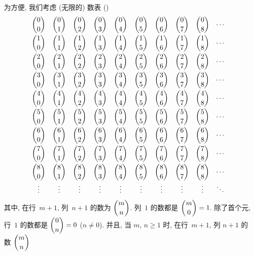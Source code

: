 \documentclass[../libro.tex]{subfiles}
\begin{document}
为方便, 我们考虑 (无限的) 数表 ()
\begin{equation}
    \begin{matrix}
        \dbinom{0}{0} & \dbinom{0}{1} & \dbinom{0}{2} & \dbinom{0}{3} & \dbinom{0}{4} & \dbinom{0}{5} & \dbinom{0}{6} & \dbinom{0}{7} & \dbinom{0}{8} & \cdots \\[2ex]
        \dbinom{1}{0} & \dbinom{1}{1} & \dbinom{1}{2} & \dbinom{1}{3} & \dbinom{1}{4} & \dbinom{1}{5} & \dbinom{1}{6} & \dbinom{1}{7} & \dbinom{1}{8} & \cdots \\[2ex]
        \dbinom{2}{0} & \dbinom{2}{1} & \dbinom{2}{2} & \dbinom{2}{3} & \dbinom{2}{4} & \dbinom{2}{5} & \dbinom{2}{6} & \dbinom{2}{7} & \dbinom{2}{8} & \cdots \\[2ex]
        \dbinom{3}{0} & \dbinom{3}{1} & \dbinom{3}{2} & \dbinom{3}{3} & \dbinom{3}{4} & \dbinom{3}{5} & \dbinom{3}{6} & \dbinom{3}{7} & \dbinom{3}{8} & \cdots \\[2ex]
        \dbinom{4}{0} & \dbinom{4}{1} & \dbinom{4}{2} & \dbinom{4}{3} & \dbinom{4}{4} & \dbinom{4}{5} & \dbinom{4}{6} & \dbinom{4}{7} & \dbinom{4}{8} & \cdots \\[2ex]
        \dbinom{5}{0} & \dbinom{5}{1} & \dbinom{5}{2} & \dbinom{5}{3} & \dbinom{5}{4} & \dbinom{5}{5} & \dbinom{5}{6} & \dbinom{5}{7} & \dbinom{5}{8} & \cdots \\[2ex]
        \dbinom{6}{0} & \dbinom{6}{1} & \dbinom{6}{2} & \dbinom{6}{3} & \dbinom{6}{4} & \dbinom{6}{5} & \dbinom{6}{6} & \dbinom{6}{7} & \dbinom{6}{8} & \cdots \\[2ex]
        \dbinom{7}{0} & \dbinom{7}{1} & \dbinom{7}{2} & \dbinom{7}{3} & \dbinom{7}{4} & \dbinom{7}{5} & \dbinom{7}{6} & \dbinom{7}{7} & \dbinom{7}{8} & \cdots \\[2ex]
        \dbinom{8}{0} & \dbinom{8}{1} & \dbinom{8}{2} & \dbinom{8}{3} & \dbinom{8}{4} & \dbinom{8}{5} & \dbinom{8}{6} & \dbinom{8}{7} & \dbinom{8}{8} & \cdots \\[2ex]
        \vdots        & \vdots        & \vdots        & \vdots        & \vdots        & \vdots        & \vdots        & \vdots        & \vdots        & \ddots \\
    \end{matrix}
    \label{eq:TriangleOfYangHui}
\end{equation}
其中, 在行~\(m+1\), 列~\(n+1\) 的数为 \(\dbinom{m}{n}\).
列~\(1\) 的数都是 \(\dbinom{m}{0} = 1\).
除了首个元, 行~\(1\) 的数都是
\(\dbinom{0}{n} = 0\) (\(n \neq 0\)).
并且, 当 \(m\), \(n \geq 1\) 时,
在行~\(m+1\), 列 \(n+1\) 的数 \(\dbinom{m}{n}\)
\end{document}
